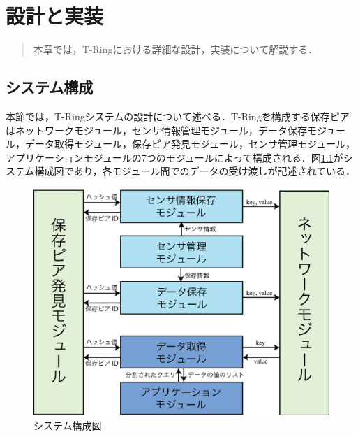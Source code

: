 \chapter{設計と実装}
\begin{large}
\begin{quote}
本章では，T-Ringにおける詳細な設計，実装について解説する．
\end{quote}
\end{large}
\clearpage

\section{システム構成}
本節では，T-Ringシステムの設計について述べる．T-Ringを構成する保存ピアはネットワークモジュール，センサ情報管理モジュール，データ保存モジュール，データ取得モジュール，保存ピア発見モジュール，センサ管理モジュール，アプリケーションモジュールの7つのモジュールによって構成される．図\ref{fig:sysconf}がシステム構成図であり，各モジュール間でのデータの受け渡しが記述されている．

\begin{figure}[htbp]
 \begin{center}
  \includegraphics[width=130mm]{./images/sysconf.eps}
 \end{center}
 \caption{システム構成図}
 \label{fig:sysconf}
\end{figure}

